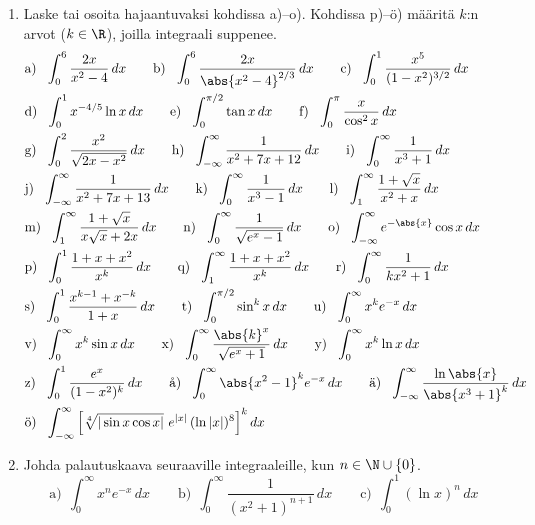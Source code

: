 \Harj
\begin{enumerate}

\item
Laske tai osoita hajaantuvaksi kohdissa a)--o). Kohdissa p)--ö) määritä $k$:n arvot ($k\in\R$),
joilla integraali suppenee.
\begin{align*}
&\text{a)}\ \ \int_0^6 \frac{2x}{x^2-4}\,dx \qquad
 \text{b)}\ \ \int_0^6 \frac{2x}{\abs{x^2-4}^{2/3}}\,dx \qquad
 \text{c)}\ \ \int_0^1 \frac{x^5}{(1-x^2)^{3/2}}\,dx \\
&\text{d)}\ \ \int_0^1 x^{-4/5}\ln x\,dx \qquad
 \text{e)}\ \ \int_0^{\pi/2} \tan x\,dx \qquad
 \text{f)}\ \ \int_0^\pi \frac{x}{\cos^2 x}\,dx \\
&\text{g)}\ \ \int_0^2 \frac{x^2}{\sqrt{2x-x^2}}\,dx \qquad
 \text{h)}\ \ \int_{-\infty}^\infty \frac{1}{x^2+7x+12}\,dx \qquad
 \text{i)}\ \ \int_0^\infty \frac{1}{x^3+1}\,dx \\
&\text{j)}\ \ \int_{-\infty}^\infty \frac{1}{x^2+7x+13}\,dx \qquad
 \text{k)}\ \ \int_0^\infty \frac{1}{x^3-1}\,dx \qquad
 \text{l)}\ \ \int_1^\infty \frac{1+\sqrt{x}}{x^2+x}\,dx \\
&\text{m)}\ \ \int_1^\infty \frac{1+\sqrt{x}}{x\sqrt{x}+2x}\,dx \qquad
 \text{n)}\ \ \int_0^\infty \frac{1}{\sqrt{e^x-1}}\,dx \qquad
 \text{o)}\ \ \int_{-\infty}^\infty e^{-\abs{x}}\cos x\,dx \\
&\text{p)}\ \ \int_0^1 \frac{1+x+x^2}{x^k}\,dx \qquad
 \text{q)}\ \ \int_1^\infty \frac{1+x+x^2}{x^k}\,dx \qquad
 \text{r)}\ \ \int_0^\infty \frac{1}{kx^2+1}\,dx \\
&\text{s)}\ \ \int_0^1 \frac{x^{k-1}+x^{-k}}{1+x}\,dx \qquad
 \text{t)}\ \ \int_0^{\pi/2} \sin^k x\,dx \qquad
 \text{u)}\ \ \int_0^\infty x^k e^{-x}\,dx \\
&\text{v)}\ \ \int_0^\infty x^k\sin x\,dx \qquad
 \text{x)}\ \ \int_0^\infty \frac{\abs{k}^x}{\sqrt{e^x+1}}\,dx \qquad
 \text{y)}\ \ \int_0^\infty x^k\ln x\,dx \\
&\text{z)}\ \ \int_0^1 \frac{e^x}{(1-x^2)^k}\,dx \qquad
 \text{å)}\ \ \int_0^\infty \abs{x^2-1}^k e^{-x}\,dx \qquad
 \text{ä)}\ \ \int_{-\infty}^\infty \frac{\ln\abs{x}}{\abs{x^3+1}^k}\,dx \\
&\text{ö)}\ \ \int_{-\infty}^\infty\left[\sqrt[4]{|\sin x\cos x|}\ e^{|x|}\,(\ln|x|)^8\right]^kdx
\end{align*}

\item
Johda palautuskaava seuraaville integraaleille, kun $n\in\N\cup\{0\}$.
\[
\text{a)}\ \ \int_0^\infty x^n e^{-x}\,dx \qquad
\text{b)}\ \ \int_0^\infty \frac{1}{(x^2+1)^{n+1}}\,dx \qquad
\text{c)}\ \ \int_0^1 (\ln x)^n\,dx
\]


\end{enumerate}
